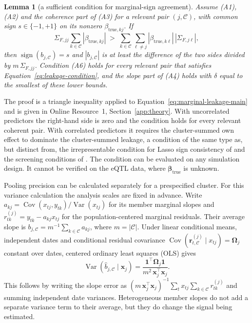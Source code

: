 \documentclass[lineno,pdflatex,sn-basic]{sn-jnl}
\theoremstyle{thmstyleone}
\newtheorem{lemma}{Lemma}
\begin{document}
\begin{lemma}[a sufficient condition for marginal-sign agreement]\label{lem:leakage}
Assume (A1), (A2) and the coherence part of (A3) for a relevant pair
$(j,\mathcal C)$, with common sign $s\in\{-1,+1\}$ on its nonzero
$\beta_{\mathrm{true},kj}$. If
\begin{equation}\label{eq:leakage-condition}
 \Sigma_{F,jj}\sum_{k\in\mathcal C}|\beta_{\mathrm{true},kj}|
 \;>\;
 \sum_{k\in\mathcal C}\sum_{\ell\ne j}
 |\beta_{\mathrm{true},k\ell}|\,|\Sigma_{F,j\ell}| ,
\end{equation}
then $\operatorname{sign}(b_{j,\mathcal C})=s$ and
$|b_{j,\mathcal C}|$ is at least the difference of the two sides divided by
$m\,\Sigma_{F,jj}$. Condition (A6) holds for every relevant pair that
satisfies Equation~\eqref{eq:leakage-condition}, and the slope part of (A4)
holds with $\delta$ equal to the smallest of these lower bounds.
\end{lemma}
The proof is a triangle inequality applied to
Equation~\eqref{eq:marginal-leakage-main} and is given in Online Resource~1,
Section~\ref{app:theory}. With uncorrelated predictors the right-hand side is
zero and the condition holds for every relevant coherent pair. With correlated
predictors it requires the cluster-summed own effect to dominate the
cluster-summed leakage, a condition of the same type as, but distinct from,
the irrepresentable condition for Lasso sign consistency of
\citet{Zhao+Yu:2006} and the screening conditions of \citet{Fan+Lv:2008}.
The condition can be evaluated on any simulation design. It cannot be verified
on the eQTL data, where $\bm\beta_{\mathrm{true}}$ is unknown.

Pooling precision can be calculated separately for a prespecified cluster.
For this variance calculation the analysis scales are fixed in advance.
Write $a_{kj}=\operatorname{Cov}(x_{tj},y_{tk})/
\operatorname{Var}(x_{tj})$ for its member marginal slopes and
$r_{tk}^{(j)}=y_{tk}-a_{kj}x_{tj}$ for the population-centered marginal
residuals. Their average slope is
$b_{j,\mathcal C}=m^{-1}\sum_{k\in\mathcal C}a_{kj}$, where
$m=|\mathcal C|$. Under linear conditional means, independent dates and
conditional residual covariance
$\operatorname{Cov}(\bm r_{t,\mathcal C}^{(j)}\mid x_{tj})=\bm\Omega_j$
constant over dates, centered ordinary least squares (OLS) gives
\begin{equation}\label{eq:pooling-variance}
	\operatorname{Var}(\widehat b_{j,\mathcal C}\mid\bm x_j)
	=\frac{\bm1^\top\bm\Omega_j\bm1}
	{m^2\,\bm x_j^\top\bm x_j}.
\end{equation}
This follows by writing the slope error as
$(m\,\bm x_j^\top\bm x_j)^{-1}
\sum_t x_{tj}\sum_{k\in\mathcal C}r_{tk}^{(j)}$ and summing independent
date variances. Heterogeneous member slopes do not add a separate variance
term to their average, but they do change the signal being estimated.
\end{document}
